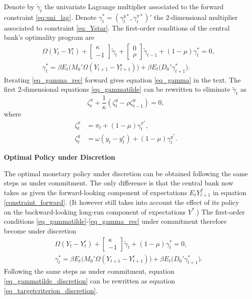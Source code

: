 Denote by $\tilde{\gamma}_t$ the univariate Lagrange multiplier associated to the forward constraint \eqref{eq:uni_lag}. Denote $\gamma_t^*=(\gamma_t^{y*},\gamma_t^{\pi*})'$ the 2-dimensional multiplier associated to constraint \eqref{eq_Ystar}. The first-order conditions of the central bank's optimality program are
\begin{align}
&\Omega (Y_t-Y_t^e)+\left[\begin{array}{c}\kappa\\ -1\end{array}\right]\tilde{\gamma}_t +\left[\begin{array}{c}0\\ \rho\end{array}\right]\tilde{\gamma}_{t-1}+(1-\mu)\gamma_t^*=0,\label{eq_gammatilde}\\
& \gamma_t^* = \beta E_t\bigg(M_0'\Omega (Y_{t+1}-Y_{t+1}^e)\bigg) + \beta E_t\bigg(D_0' \gamma_{t+1}^*\bigg).\label{eq_gamma_rec}
\end{align}
Iterating \eqref{eq_gamma_rec} forward gives equation \eqref{eq_gamma} in the text.
The first 2-dimensional equations \eqref{eq_gammatilde} can be rewritten to eliminate $\tilde{\gamma}_t$ as
\begin{equation}
\zeta_t^{\pi} + \frac{1}{\kappa} (\zeta_t^y-\rho \zeta_{t-1}^y) = 0,\label{eq_optimality}
\end{equation}
where
\begin{align}
\zeta_t^{\pi} &= \pi_t +(1-\mu) \gamma_t^{\pi^*},\\
\zeta_t^{y} &= \omega (y_t-y_t^e) +(1-\mu) \gamma_t^{y^*}.
\end{align}

\noindent \textbf{Optimal Policy under Discretion}

The optimal monetary policy under discretion can be obtained following the same steps as under commitment. The only difference is that the central bank now takes as given the forward-looking component of expectations $E_t Y_{t+1}^f$ in equation \eqref{constraint_forward}. (It however still takes into account the effect of its policy on the backward-looking long-run component of expectations $Y^*$.) The first-order conditions \eqref{eq_gammatilde}-\eqref{eq_gamma_rec} under commitment therefore become under discretion
\begin{align}
&\Omega (Y_t-Y_t^e)+\left[\begin{array}{c}\kappa\\ -1\end{array}\right]\tilde{\gamma}_t +(1-\mu)\gamma_t^*=0,\label{eq_gammatilde_discretion}\\
& \gamma_t^* = \beta E_t\bigg(M_0'\Omega (Y_{t+1}-Y_{t+1}^e)\bigg) + \beta E_t\bigg(D_0' \gamma_{t+1}^*\bigg).\label{eq_gamma_rec_discretion}
\end{align}
Following the same steps as under commitment, equation \eqref{eq_gammatilde_discretion} can be rewritten as equation \eqref{eq_targetcriterion_discretion}.

